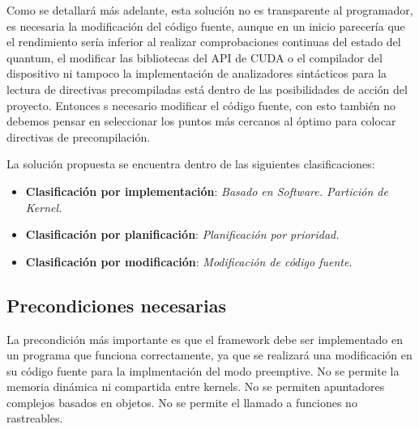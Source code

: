   

Como se detallará más adelante, esta solución no es transparente al programador, es necesaria la modificación del código fuente, aunque en un inicio parecería que el rendimiento sería inferior al realizar comprobaciones continuas del estado del quantum, el modificar las bibliotecas del API de CUDA o el compilador del dispositivo ni tampoco la implementación de analizadores sintácticos para la lectura de directivas precompiladas está dentro de las posibilidades de acción del proyecto. 
Entonces s necesario modificar el código fuente, con esto también no debemos pensar en seleccionar los puntos más cercanos al óptimo para colocar directivas de precompilación.
\newline 

La solución propuesta se encuentra dentro de las siguientes clasificaciones:
\begin{itemize}

\item \textbf{Clasificación por implementación}: \textit{Basado en Software. Partición de Kernel.}
\item \textbf{Clasificación por planificación}: \textit{Planificación por prioridad.}
\item \textbf{Clasificación por modificación}: \textit{Modificación de código fuente.}

\end{itemize}   

\subsection{Precondiciones necesarias}
La precondición más importante es que el framework debe ser implementado en un programa que funciona correctamente, ya que se realizará una modificación en su código fuente para la implmentación del modo preemptive.
No se permite la memoria dinámica ni compartida entre kernels.
No se permiten apuntadores complejos basados en objetos.
No se permite el llamado a funciones no rastreables.

